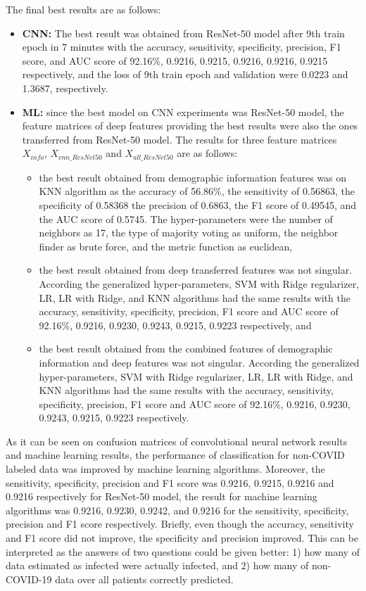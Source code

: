 The final best results are as follows:
\begin{itemize}
    \item \textbf{CNN:} The best result was obtained from ResNet-50 model after 9th train epoch in 7 minutes with the accuracy, sensitivity, specificity, precision, F1 score, and AUC score of 92.16\%, 0.9216, 0.9215, 0.9216, 0.9216, 0.9215 respectively, and the loss of 9th train epoch and validation were 0.0223 and 1.3687, respectively.
    \item \textbf{ML:} since the best model on CNN experiments was ResNet-50 model, the feature matrices of deep features providing the best results were also the ones transferred from ResNet-50 model. The results for three feature matrices $X_{info}$, $X_{cnn\_ResNet50}$ and $X_{all\_ResNet50}$ are as follows:
    \begin{itemize}
        \item the best result obtained from demographic information features was on KNN algorithm as the accuracy of 56.86\%, the sensitivity of 0.56863, the specificity of 0.58368 the precision of 0.6863, the F1 score of 0.49545, and the AUC score of 0.5745. The hyper-parameters were the number of neighbors as 17, the type of majority voting as uniform, the neighbor finder as brute force, and the metric function as euclidean,
        \item the best result obtained from deep transferred features was not singular. According the generalized hyper-parameters, SVM with Ridge regularizer, LR, LR with Ridge, and KNN algorithms had the same results with the accuracy, sensitivity, specificity, precision, F1 score and AUC score of 92.16\%, 0.9216, 0.9230, 0.9243, 0.9215, 0.9223 respectively, and
        \item the best result obtained from the combined features of demographic information and deep features was not singular. According the generalized hyper-parameters, SVM with Ridge regularizer, LR, LR with Ridge, and KNN algorithms had the same results with the accuracy, sensitivity, specificity, precision, F1 score and AUC score of 92.16\%, 0.9216, 0.9230, 0.9243, 0.9215, 0.9223 respectively.
    \end{itemize}
\end{itemize}

As it can be seen on confusion matrices of convolutional neural network results and machine learning results, the performance of classification for non-COVID labeled data was improved by machine learning algorithms. Moreover, the sensitivity, specificity, precision and F1 score was 0.9216, 0.9215, 0.9216 and 0.9216 respectively for ResNet-50 model, the result for machine learning algorithms was 0.9216, 0.9230, 0.9242, and 0.9216 for the sensitivity, specificity, precision and F1 score respectively. Briefly, even though the accuracy, sensitivity and F1 score did not improve, the specificity and precision improved. This can be interpreted as the answers of two questions could be given better: 1) how many of data estimated as infected were actually infected, and 2) how many of non-COVID-19 data over all patients correctly predicted.

